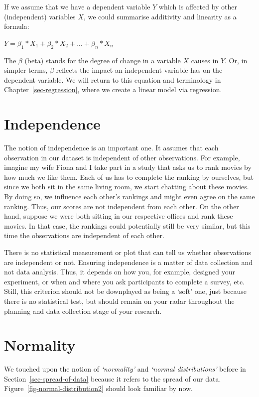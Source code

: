 \documentclass[
  letterpaper,
  DIV=11,
  numbers=noendperiod]{scrreprt}
\begin{document}
If we assume that we have a dependent variable \(Y\) which is affected
by other (independent) variables \(X\), we could summarise additivity
and linearity as a formula:

\label{linearity_additivity-formula}
\(Y = \beta_{1} * X_1 + \beta_{2} * X_{2} + ... + \beta_{n} * X_{n}\)

The \(\beta\) (beta) stands for the degree of change in a variable \(X\)
causes in \(Y\). Or, in simpler terms, \(\beta\) reflects the impact an
independent variable has on the dependent variable. We will return to
this equation and terminology in Chapter~\ref{sec-regression}, where we
create a linear model via regression.

\section{Independence}\label{sec-independence}

The notion of independence is an important one. It assumes that each
observation in our dataset is independent of other observations. For
example, imagine my wife Fiona and I take part in a study that asks us
to rank movies by how much we like them. Each of us has to complete the
ranking by ourselves, but since we both sit in the same living room, we
start chatting about these movies. By doing so, we influence each
other's rankings and might even agree on the same ranking. Thus, our
scores are not independent from each other. On the other hand, suppose
we were both sitting in our respective offices and rank these movies. In
that case, the rankings could potentially still be very similar, but
this time the observations are independent of each other.

There is no statistical measurement or plot that can tell us whether
observations are independent or not. Ensuring independence is a matter
of data collection and not data analysis. Thus, it depends on how you,
for example, designed your experiment, or when and where you ask
participants to complete a survey, etc. Still, this criterion should not
be downplayed as being a `soft' one, just because there is no
statistical test, but should remain on your radar throughout the
planning and data collection stage of your research.

\section{Normality}\label{sec-normality}

We touched upon the notion of \emph{`normality'} and \emph{`normal
distributions'} before in Section~\ref{sec-spread-of-data} because it
refers to the spread of our data. Figure~\ref{fig-normal-distribution2}
should look familiar by now.
\end{document}
